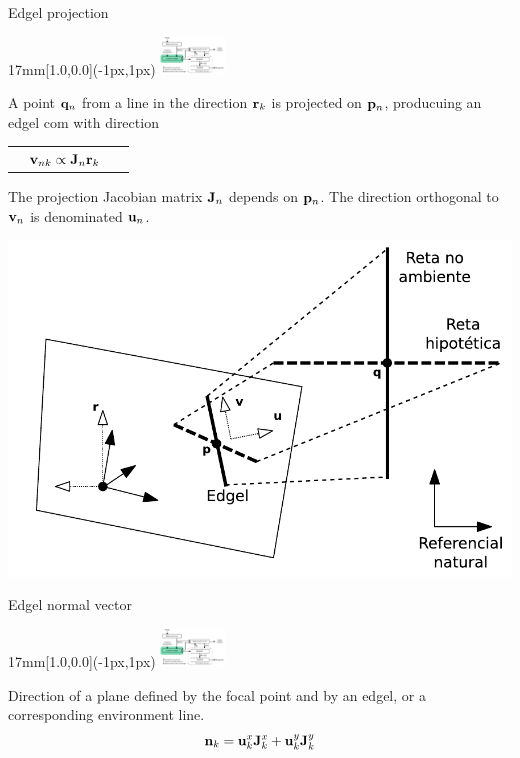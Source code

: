 \begin{frame}{Edgel projection}
  \begin{overprint}
  \begin{textblock*}{17mm}[1.0,0.0](\paperwidth-1px,1px)
    \includegraphics[width=17mm]{blocos_s2.png}
  \end{textblock*}
  A point ${\mathbf{q}}_n$ from a line in the direction ${\mathbf{r}}_k$ is projected on ${\mathbf{p}}_n$, producuing an edgel com with direction
  \begin{tabularx}{\linewidth}{XCR}
    & ${\mathbf{v}}_{nk}\propto{\mathbf{J}}_n{\mathbf{r}}_k$ & ~
  \end{tabularx}
  
  The projection Jacobian matrix ${\mathbf{J}}_n$ depends on ${\mathbf{p}}_n$. The direction orthogonal to ${\mathbf{v}}_n$ is denominated ${\mathbf{u}}_n$.

  \centerline{\includegraphics[height=8\baselineskip]{variaveis.pdf}}

\end{overprint}
\end{frame}


\begin{frame}{Edgel normal vector}
  \begin{textblock*}{17mm}[1.0,0.0](\paperwidth-1px,1px)
    \includegraphics[width=17mm]{blocos_s2.png}
  \end{textblock*}

  Direction of a plane defined by the focal point and by an edgel, or a corresponding environment line.
  \[
  {\mathbf{n}}_k = {\mathbf{u}}_k^x {\mathbf{J}}_k^x +  {\mathbf{u}}_k^y {\mathbf{J}}_k^y
  \]


\end{frame}














